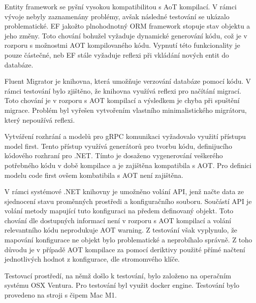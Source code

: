 

Entity framework se pyšní vysokou kompatibilitou s AoT kompilací. V rámci vývoje nebyly zaznamenány problémy, avšak následné testování se ukázalo problematické. EF jakožto plnohodnotný ORM framework stopuje stav objektu a jeho změny. Toto chování bohužel vyžaduje dynamické generování kódu, což je v rozporu s možnostmi AOT kompilovaného kódu. Vypnutí této funkcionality je pouze částečné, neb EF stále vyžaduje reflexi při vkládání nových entit do databáze.


Fluent Migrator je knihovna, která umožňuje verzování databáze pomocí kódu. V rámci testování bylo zjištěno, že knihovna využívá reflexi pro načítání migrací. Toto chování je v rozporu s AOT kompilací a výsledkem je chyba při spuštění migrace. Problém byl vyřešen vytvořením vlastního minimalistického migrátoru, který nepoužívá reflexi.


Vytváření rozhrání a modelů pro gRPC komunikaci vyžadovalo využití přístupu model first. Tento přístup využívá generátorů pro tvorbu kódu, definijucího kódového rozhraní pro .NET. Tímto je dosaženo vygenerování veškerého potřebného kódu v době kompilace a je zajištěna kompatibila s AOT. Pro definici modelu code first ovšem kombatibila s AOT není zajištěna.


V rámci systémové .NET knihovny je umožněno volání API, jenž načte data ze sjednocení stavu proměnných prostředi a konfiguračního souboru. Součástí API je volání metody mapující tuto konfiguraci na předem definovaný objekt. Toto chování dle dostupných informací není v rozporu s AOT kompilací a volání relevantního kódu neprodukuje AOT warning. Z testování však vyplynulo, že mapování konfigurace ne objekt bylo problematické a neprobíhalo správně. Z toho důvodu je v případě AOT kompilace za pomocí deriktivy použité přímé načtení jednotlivých hodnot z konfigurace, dle stromomvého klíče.



Testovací prostředí, na němž došlo k testování, bylo založeno na operačním systému OSX Ventura. Pro testování byl využit docker engine. Testování bylo provedeno na stroji s čipem Mac M1.

